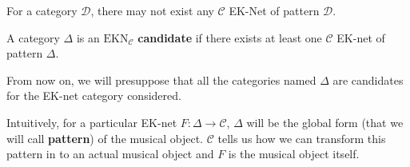 \begin{rem}
    For a category $\mathcal{D}$, there may not exist any $\mathcal{C}$ EK-Net of pattern $\mathcal{D}$.
\end{rem}

\begin{defn}[EK candidate]
    A category $\Delta$ is an $\text{EKN}_{\mathcal{C}}$ \textbf{candidate} if there exists at least one $\mathcal{C}$ EK-net of pattern $\Delta$.
\end{defn}

\begin{note}
    From now on, we will presuppose that all the categories named $\Delta$ are candidates for the EK-net category considered.
\end{note}

Intuitively, for a particular EK-net $F : \Delta \rightarrow \mathcal{C}$, $\Delta$ will be the global form (that we will call \textbf{pattern}) of the musical object. $\mathcal{C}$ tells us how we can transform this pattern in to an actual musical object and  $F$ is the musical object itself.








